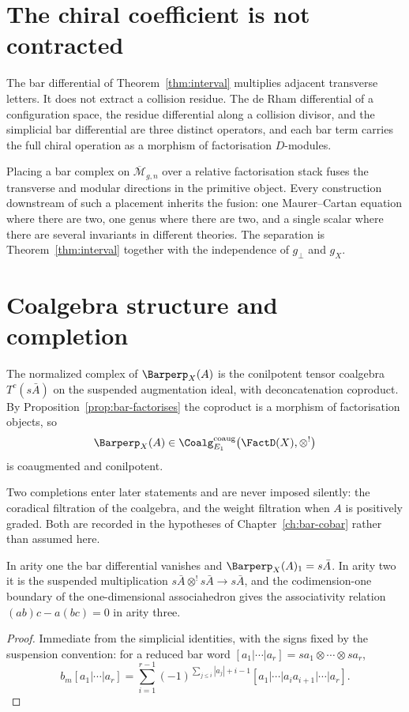 \section{The chiral coefficient is not contracted}

The bar differential of Theorem~\ref{thm:interval} multiplies adjacent
transverse letters. It does not extract a collision residue. The de Rham
differential of a configuration space, the residue differential along a
collision divisor, and the simplicial bar differential are three distinct
operators, and each bar term carries the full chiral operation as a
morphism of factorisation $D$-modules.

\begin{remark}
\label{rem:superposition}
Placing a bar complex on $\overline{\mathcal M}_{g,n}$ over a relative
factorisation stack fuses the transverse and modular directions in the
primitive object. Every construction downstream of such a placement
inherits the fusion: one Maurer--Cartan equation where there are two, one
genus where there are two, and a single scalar where there are several
invariants in different theories. The separation is
Theorem~\ref{thm:interval} together with the independence of $g_\perp$
and $g_X$.
\end{remark}

\section{Coalgebra structure and completion}

The normalized complex of $\Barperp_X(A)$ is the conilpotent tensor
coalgebra $T^c(s\bar A)$ on the suspended augmentation ideal, with
deconcatenation coproduct. By Proposition~\ref{prop:bar-factorises} the
coproduct is a morphism of factorisation objects, so
\[
  \Barperp_X(A) \in
  \Coalg^{\mathrm{coaug}}_{E_1}\bigl(\FactD(X),\otimes^!\bigr)
\]
is coaugmented and conilpotent.

Two completions enter later statements and are never imposed silently:
the coradical filtration of the coalgebra, and the weight filtration when
$A$ is positively graded. Both are recorded in the hypotheses of
Chapter~\ref{ch:bar-cobar} rather than assumed here.

\begin{proposition}
\label{prop:low-arity}
\StatusProved{} In arity one the bar differential vanishes and
$\Barperp_X(A)_1 = s\bar A$. In arity two it is the suspended
multiplication $s\bar A\otimes^! s\bar A \to s\bar A$, and the
codimension-one boundary of the one-dimensional associahedron gives the
associativity relation $(ab)c-a(bc)=0$ in arity three.
\end{proposition}

\begin{proof}
Immediate from the simplicial identities, with the signs fixed by the
suspension convention: for a reduced bar word
$[a_1|\cdots|a_r]=sa_1\otimes\cdots\otimes sa_r$,
\[
  b_m[a_1|\cdots|a_r] = \sum_{i=1}^{r-1}
  (-1)^{\sum_{j\le i}|a_j| + i - 1}
  [a_1|\cdots|a_ia_{i+1}|\cdots|a_r].
\]
\end{proof}
